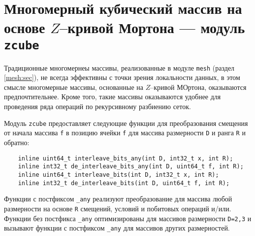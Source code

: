 \section{Многомерный кубический массив на основе $Z$--кривой Мортона --- модуль {\tt zcube}}\label{zcube:sec}
Традиционные многомернеы массивы, реализованные в модуле \verb'mesh' (раздел \ref{mesh:sec}),
не всегда эффективны с точки зрения локальности данных, в этом смысле
многомерные массивы, основанные на $Z$--кривой МОртона, оказываются предпочтительнее.
Кроме того, такие массивы оказываются удобнее для проведения ряда операций по 
рекурсивному разбиению сеток.

Модуль \verb'zcube' предоставляет следующие функции для преобразования смещения от начала массива \verb'f' в позицию ячейки \verb'f'
для массива размерности \verb'D' и ранга \verb'R' и обратно: 
\begin{verbatim}
	inline uint64_t interleave_bits_any(int D, int32_t x, int R);
	inline int32_t de_interleave_bits_any(int D, uint64_t f, int R);
	inline uint64_t interleave_bits(int D, int32_t x, int R);
	inline int32_t de_interleave_bits(int D, uint64_t f, int R);
\end{verbatim}
Функции с постфиксом \verb'_any' реализуют преобразование для массива любой размерности на основе \verb'R' смещений, условий и побитовых операций и/или.
Функции без постфикса \verb'_any' оптимизированы для массивов размерности \verb'D=2,3' и вызывают функции с постфиксом \verb'_any'
для массивов других размерностей.

